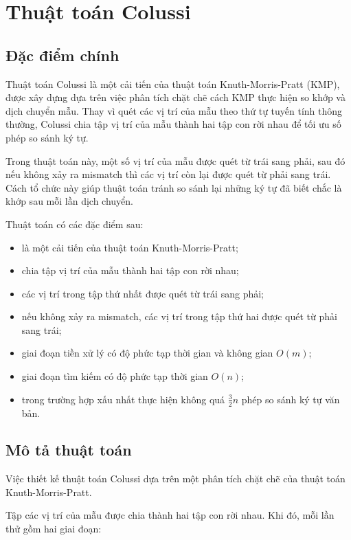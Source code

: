 \section{Thuật toán Colussi}

\subsection{Đặc điểm chính}
Thuật toán Colussi là một cải tiến của thuật toán Knuth-Morris-Pratt (KMP), được xây dựng dựa trên việc phân tích chặt chẽ cách KMP thực hiện so khớp và dịch chuyển mẫu. Thay vì quét các vị trí của mẫu theo thứ tự tuyến tính thông thường, Colussi chia tập vị trí của mẫu thành hai tập con rời nhau để tối ưu số phép so sánh ký tự.

Trong thuật toán này, một số vị trí của mẫu được quét từ trái sang phải, sau đó nếu không xảy ra mismatch thì các vị trí còn lại được quét từ phải sang trái. Cách tổ chức này giúp thuật toán tránh so sánh lại những ký tự đã biết chắc là khớp sau mỗi lần dịch chuyển.

Thuật toán có các đặc điểm sau:

\begin{itemize}
    \item là một cải tiến của thuật toán Knuth-Morris-Pratt;
    \item chia tập vị trí của mẫu thành hai tập con rời nhau;
    \item các vị trí trong tập thứ nhất được quét từ trái sang phải;
    \item nếu không xảy ra mismatch, các vị trí trong tập thứ hai được quét từ phải sang trái;
    \item giai đoạn tiền xử lý có độ phức tạp thời gian và không gian $O(m)$;
    \item giai đoạn tìm kiếm có độ phức tạp thời gian $O(n)$;
    \item trong trường hợp xấu nhất thực hiện không quá $\frac{3}{2}n$ phép so sánh ký tự văn bản.
\end{itemize}

\subsection{Mô tả thuật toán}
Việc thiết kế thuật toán Colussi dựa trên một phân tích chặt chẽ của thuật toán Knuth-Morris-Pratt.

Tập các vị trí của mẫu được chia thành hai tập con rời nhau. Khi đó, mỗi lần thử gồm hai giai đoạn:

